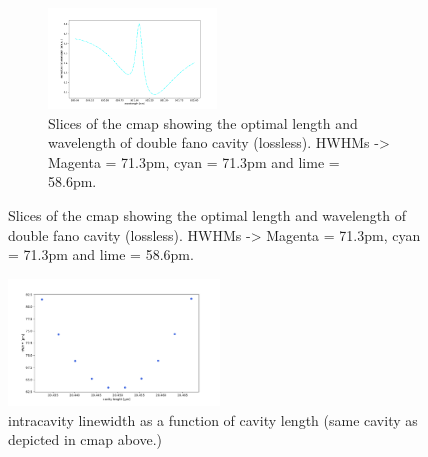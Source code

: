 \begin{figure}
\begin{subfigure}[c]{0.49\textwidth}
        \includegraphics[width=0.49\textwidth]{figures/cmap_slice3.pdf}
        \caption{Slices of the cmap showing the optimal length and wavelength of double fano cavity (lossless). HWHMs -> Magenta = 71.3pm, cyan = 71.3pm and lime = 58.6pm.}
    \end{subfigure}
\end{figure}

\begin{figure}
    \centering
    \includegraphics[width=0.5\textwidth]{figures/cmap_lw_vs_l_intracavity.pdf}
    \caption{intracavity linewidth as a function of cavity length (same cavity as depicted in cmap above.)}
\end{figure}

